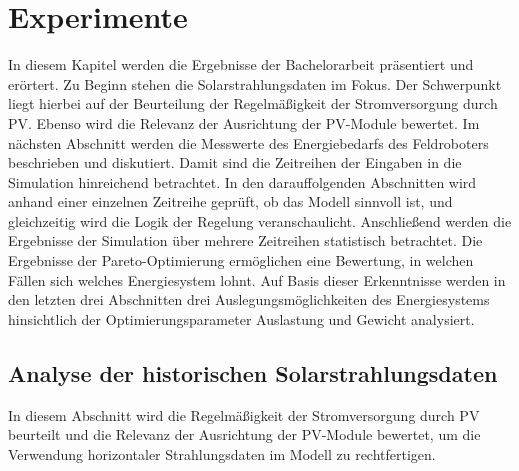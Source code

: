 \clearpage
\section{Experimente}
In diesem Kapitel werden die Ergebnisse der Bachelorarbeit präsentiert und erörtert. Zu Beginn stehen die Solarstrahlungsdaten im Fokus. Der Schwerpunkt liegt hierbei auf der Beurteilung der Regelmäßigkeit der Stromversorgung durch PV. Ebenso wird die Relevanz der Ausrichtung der PV-Module bewertet. Im nächsten Abschnitt werden die Messwerte des Energiebedarfs des Feldroboters beschrieben und diskutiert. Damit sind die Zeitreihen der Eingaben in die Simulation hinreichend betrachtet. In den darauffolgenden Abschnitten wird anhand einer einzelnen Zeitreihe geprüft, ob das Modell sinnvoll ist, und gleichzeitig wird die Logik der Regelung veranschaulicht. Anschließend werden die Ergebnisse der Simulation über mehrere Zeitreihen statistisch betrachtet. Die Ergebnisse der Pareto-Optimierung ermöglichen eine Bewertung, in welchen Fällen sich welches Energiesystem lohnt. Auf Basis dieser Erkenntnisse werden in den letzten drei Abschnitten drei Auslegungsmöglichkeiten des Energiesystems hinsichtlich der Optimierungsparameter Auslastung und Gewicht analysiert.

\subsection{Analyse der historischen Solarstrahlungsdaten} \label{strahlung}
In diesem Abschnitt wird die Regelmäßigkeit der Stromversorgung durch PV beurteilt und die Relevanz der Ausrichtung der PV-Module bewertet, um die Verwendung horizontaler Strahlungsdaten im Modell zu rechtfertigen.


